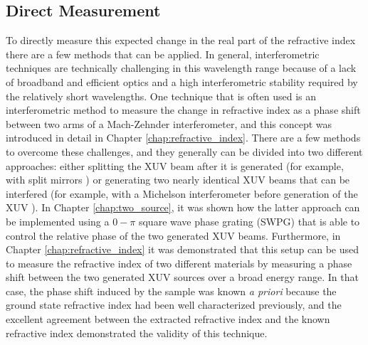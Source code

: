 \subsection{Direct Measurement}

To directly measure this expected change in the real part of the refractive index there are a few methods that can be applied.  In general, interferometric techniques are technically challenging in this wavelength range because of a lack of broadband and efficient optics and a high interferometric stability required by the relatively short wavelengths. One technique that is often used is an interferometric method to measure the change in refractive index as a phase shift between two arms of a Mach-Zehnder interferometer, and this concept was introduced in detail in Chapter \ref{chap:refractive_index}.  There are a few methods to overcome these challenges, and they generally can be divided into two different approaches: either splitting the XUV beam after it is generated (for example, with split mirrors \cite{nabekawaInterferometricAutocorrelationAttosecond2008, nabekawaInterferometryAttosecondPulse2013}) or generating two nearly identical XUV beams that can be interfered (for example, with a Michelson interferometer before generation of the XUV \cite{kovacevExtremeUltravioletFourierTransform2005}).  In Chapter \ref{chap:two_source}, it was shown how the latter approach can be implemented using a  $0-\pi$ square wave phase grating (SWPG) that is able to control the relative phase of the two generated XUV beams.  Furthermore, in Chapter \ref{chap:refractive_index} it was demonstrated that this setup can be used to measure the refractive index of two different materials by measuring a phase shift between the two generated XUV sources over a broad energy range.  In that case, the phase shift induced by the sample was known \textit{a priori} because the ground state refractive index had been well characterized previously, and the excellent agreement between the extracted refractive index and the known refractive index demonstrated the validity of this technique.  

